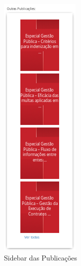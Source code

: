 \begin{figure}[htb]%
	\begin{center}
		\includegraphics[scale=0.55]{./imagens/publicacoes-sidebar.png}%
	\end{center}%
	\caption{Sidebar das Publicações\label{fig:publicacoes-sidebar}}%
\end{figure}%
